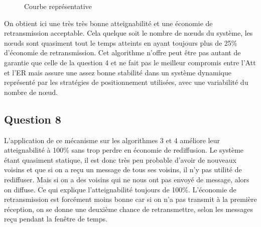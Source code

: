 \documentclass[10pt]{report}
\begin{document}
\begin{figure}[H]
\begin{minipage}{0.5\textwidth}
\begin{flushright}
	\caption[courbe1]{Courbe représentative}	
\end{flushright}\end{minipage}
\end{figure}

On obtient ici une très très bonne atteignabilité et une économie de retransmission acceptable. Cela quelque soit le nombre de nœuds du système, les nœuds sont quasiment tout le temps atteints en ayant toujours plus de 25\% d’économie de retransmission. Cet algorithme n’offre peut être pas autant de  garantie que celle de la question 4 et ne fait pas le meilleur compromis entre l’Att et l’ER mais assure une assez bonne stabilité dans un système dynamique représenté par les stratégies de positionnement utilisées, avec une variabilité du nombre de nœud.

\subsection{Question 8}

L’application de ce mécanisme sur les algorithmes 3 et 4 améliore leur atteignabilité à 100\% sans trop perdre en économie de rediffusion.
Le système étant quasiment statique, il est donc très peu probable d’avoir de nouveaux voisins et que si on a reçu un message de tous ses voisins, il n’y pas utilité de rediffuser. Mais si on a des voisins qui ne nous ont pas envoyé de message, alors on diffuse. Ce qui explique l’atteignabilité toujours de 100\%. 
L’économie de retransmission est forcément moins bonne car si on n'a pas transmit à la première réception, on se donne une deuxième chance de retransmettre, selon les messages reçu pendant la fenêtre de temps.
\end{document}
